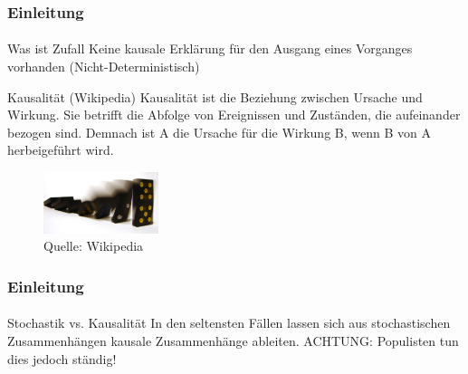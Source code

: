 \documentclass{beamer}
\begin{document}
\begin{frame}
    \frametitle{Einleitung}
\framesubtitle{}

    \begin{block}{Was ist Zufall}
Keine kausale Erklärung für den Ausgang eines Vorganges vorhanden (Nicht-Deterministisch)
\end{block}



   \begin{block}{Kausalität (Wikipedia)}
Kausalität ist die Beziehung zwischen Ursache und Wirkung. Sie betrifft die Abfolge von Ereignissen und Zuständen, die aufeinander bezogen sind. Demnach ist A die Ursache für die Wirkung B, wenn B von A herbeigeführt wird.
\end{block}

\begin{figure}[htp]
      \centering
    \includegraphics[width=0.3\textwidth]{img/Domino}

      \caption{Quelle: Wikipedia}
\end{figure}


\end{frame}


\begin{frame}
    \frametitle{Einleitung}
\framesubtitle{}
   \begin{block}{Stochastik vs. Kausalität}
In den seltensten Fällen lassen sich aus stochastischen Zusammenhängen kausale Zusammenhänge ableiten. ACHTUNG: Populisten tun dies jedoch ständig!
\end{block}

\end{frame}
\end{document}
